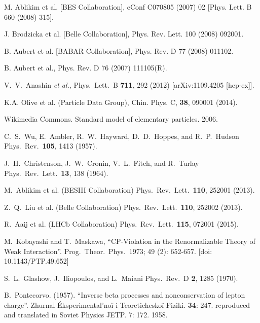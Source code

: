 \begin{thebibliography}{99}


M. Ablikim et al. [BES Collaboration], eConf C070805 (2007) 02 [Phys. Lett. B 660 (2008) 315].

J. Brodzicka et al. [Belle Collaboration], Phys. Rev. Lett. 100 (2008) 092001.

B. Aubert et al. [BABAR Collaboration], Phys. Rev. D 77 (2008) 011102.

B. Aubert et al., Phys. Rev. D 76 (2007) 111105(R).

  V.~V.~Anashin {\it et al.},
  Phys.\ Lett.\ B {\bf 711}, 292 (2012)
  [arXiv:1109.4205 [hep-ex]].



  K.A. Olive et al. (Particle Data Group),
  Chin. Phys. C, {\bf 38}, 090001 (2014).

  Wikimedia Commons.
  Standard model of elementary particles. 2006.

  C.~S.~Wu, E.~Ambler, R.~W.~Hayward, D.~D.~Hoppes, and R.~P.~Hudson
  Phys.\ Rev.\ {\bf 105}, 1413 (1957).

  J.~H.~Christenson, J.~W.~Cronin, V.~L.~Fitch, and R.~Turlay
  Phys.\ Rev.\ Lett.\ {\bf 13}, 138 (1964).

  M.~Ablikim et al. (BESIII Collaboration)
  Phys.\ Rev.\ Lett.\ {\bf 110}, 252001 (2013).

  Z.~Q.~Liu et al. (Belle Collaboration)
  Phys.\ Rev.\ Lett.\ {\bf 110}, 252002 (2013).

  R.~Aaij et al. (LHCb Collaboration)
  Phys.\ Rev.\ Lett.\ {\bf 115}, 072001 (2015).

  M.~Kobayashi and T.~Maskawa,
  ``CP-Violation in the Renormalizable Theory of Weak Interaction''.
  Prog.\ Theor.\ Phys.\ 1973; 49 (2): 652-657. 
  [doi: 10.1143/PTP.49.652]

  S.~L.~Glashow, J.~Iliopoulos, and L.~Maiani
  Phys.\ Rev.\ D {\bf 2}, 1285 (1970).

  B.~Pontecorvo. (1957).
  ``Inverse beta processes and nonconservation of lepton charge''.
  Zhurnal Éksperimental’noĭ i Teoreticheskoĭ Fiziki.  {\bf 34}: 247.
  reproduced and translated in Soviet Physics JETP. 7: 172. 1958.


\end{thebibliography}
